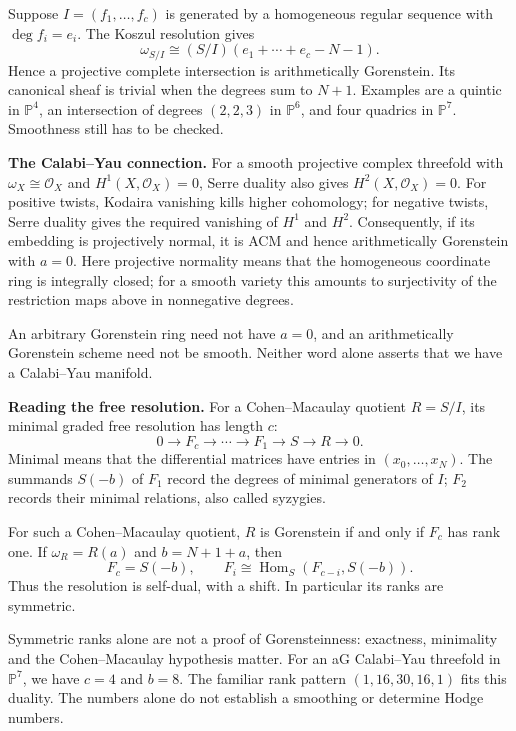 \begin{example}
\label{example-ag-complete-intersection}
Suppose $I=(f_1,\ldots,f_c)$ is generated
by a homogeneous regular sequence with
$\deg f_i=e_i$. The Koszul resolution gives
$$
\omega_{S/I}\cong
(S/I)(e_1+\cdots+e_c-N-1).
$$
Hence a projective complete intersection is
arithmetically Gorenstein. Its canonical
sheaf is trivial when the degrees sum to
$N+1$. Examples are a quintic in
$\mathbb P^4$, an intersection of degrees
$(2,2,3)$ in $\mathbb P^6$, and four
quadrics in $\mathbb P^7$.
Smoothness still has to be checked.
\end{example}

\medskip\noindent
{\bf The Calabi--Yau connection.}
For a smooth projective complex threefold
with $\omega_X\cong\mathcal O_X$ and
$H^1(X,\mathcal O_X)=0$, Serre duality also
gives $H^2(X,\mathcal O_X)=0$.
For positive twists, Kodaira vanishing
kills higher cohomology; for negative twists,
Serre duality gives the required vanishing
of $H^1$ and $H^2$.
Consequently, if its embedding is
projectively normal, it is ACM and hence
arithmetically Gorenstein with $a=0$.
Here projective normality means that the
homogeneous coordinate ring is integrally
closed; for a smooth variety this amounts
to surjectivity of the restriction maps
above in nonnegative degrees.

An arbitrary Gorenstein ring need not have
$a=0$, and an arithmetically Gorenstein
scheme need not be smooth. Neither word
alone asserts that we have a Calabi--Yau
manifold.

\medskip\noindent
{\bf Reading the free resolution.}
For a Cohen--Macaulay quotient $R=S/I$,
its minimal graded free resolution has
length $c$:
$$
0\longrightarrow F_c\longrightarrow\cdots
\longrightarrow F_1\longrightarrow S
\longrightarrow R\longrightarrow0.
$$
Minimal means that the differential matrices
have entries in $(x_0,\ldots,x_N)$.
The summands $S(-b)$ of $F_1$ record the
degrees of minimal generators of $I$;
$F_2$ records their minimal relations,
also called syzygies.

\begin{theorem}
\label{theorem-gorenstein-resolution}
For such a Cohen--Macaulay quotient,
$R$ is Gorenstein if and only if $F_c$ has
rank one. If $\omega_R=R(a)$ and
$b=N+1+a$, then
$$
F_c=S(-b),\qquad
F_i\cong
\operatorname{Hom}_S(F_{c-i},S(-b)).
$$
Thus the resolution is self-dual, with a
shift. In particular its ranks are symmetric.
\end{theorem}

Symmetric ranks alone are not a proof of
Gorensteinness: exactness, minimality and
the Cohen--Macaulay hypothesis matter.
For an aG Calabi--Yau threefold in
$\mathbb P^7$, we have $c=4$ and $b=8$.
The familiar rank pattern
$(1,16,30,16,1)$ fits this duality.
The numbers alone do not establish a
smoothing or determine Hodge numbers.

